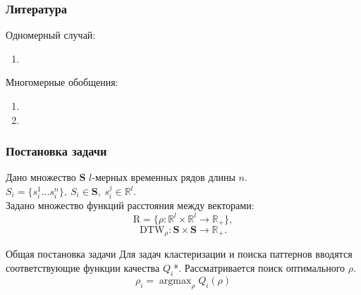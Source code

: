 \documentclass{beamer}
\DeclareMathOperator*{\argmax}{argmax}
\begin{document}
\begin{frame}
\frametitle{Литература}

    Одномерный случай:
    \begin{enumerate}
        \item{}
    \end{enumerate}
    Многомерные обобщения:
    \begin{enumerate}
        \item{}
        \item{}
    \end{enumerate}
\end{frame}

\begin{frame}
\frametitle{Постановка задачи}
    \begin{block}{}
        Дано множество $\boldsymbol{S}$ $l$\--мерных  временных рядов длины $n$. $S_i = \{s_i^1 \dots s_i^n\},\ S_i \in \boldsymbol{S},\ s_i^j \in \mathbb{R}^l$.\\
        Задано множество функций расстояния между векторами:
        $$\mathrm{R} = \{\rho: \mathbb{R}^l \times \mathbb{R}^l \rightarrow \mathbb{R}_+ \},$$
        $$\text{DTW}_{\rho}: \boldsymbol{S} \times \boldsymbol{S} \rightarrow \mathbb{R}_+.$$
    \end{block}

    \begin{block}{Общая постановка задачи}
        Для задач кластеризации и поиска паттернов вводятся соответствующие функции качества $Q_i$*.
        Рассматривается поиск оптимального $\rho$.
        $$
            \rho_i = \argmax_{\rho} Q_i(\rho)
        $$
    \end{block}
\end{frame}
\end{document}
